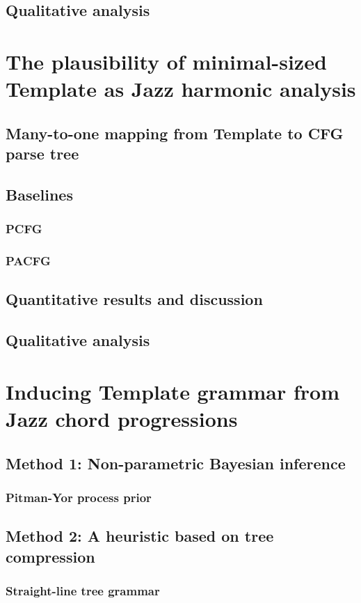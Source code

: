     \section{Qualitative analysis}
\chapter{The plausibility of minimal-sized Template as Jazz harmonic analysis}
    \section{Many-to-one mapping from Template to CFG parse tree}
    \section{Baselines}
        \subsection{PCFG}
        \subsection{PACFG}
    \section{Quantitative results and discussion}
    \section{Qualitative analysis}
\chapter{Inducing Template grammar from Jazz chord progressions}
    \section{Method 1: Non-parametric Bayesian inference}
        \subsection{Pitman-Yor process prior}
    \section{Method 2: A heuristic based on tree compression} 
        \subsection{Straight-line tree grammar}
